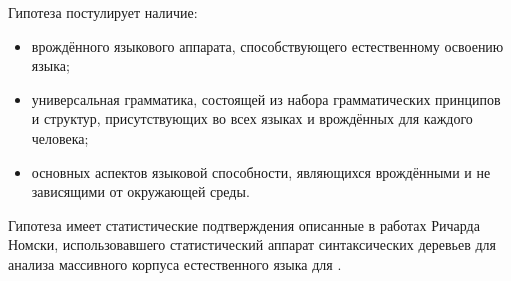Гипотеза постулирует наличие:
\begin{itemize}
    \item врождённого языкового аппарата, способствующего естественному освоению языка;
    \item универсальная грамматика, состоящей из набора грамматических принципов и структур, присутствующих во всех языках и врождённых для каждого человека;
    \item основных аспектов языковой способности, являющихся врождёнными и не зависящими от окружающей среды.
\end{itemize}

Гипотеза имеет статистические подтверждения описанные в работах Ричарда Номски,
использовавшего статистический аппарат синтаксических деревьев для анализа массивного
корпуса естественного языка для \cite{everaert2015structures}\cite{montague1970universal}.





